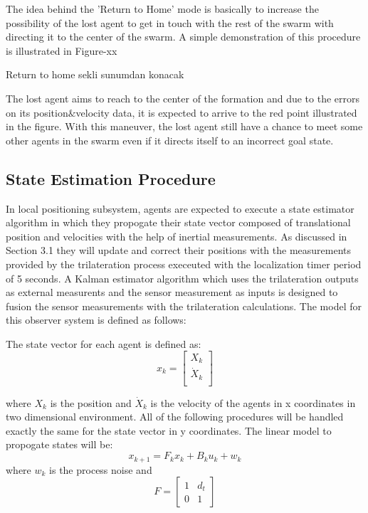 \documentclass[twoside]{article}
\begin{document}
\begin{multicols}{2}
	The idea behind the 'Return to Home' mode is basically to increase the possibility of the lost agent to get in touch with the rest of the swarm with directing it to the center of the swarm. A simple demonstration of this procedure is illustrated in Figure-xx
	
	
	Return to home sekli sunumdan konacak
	
	
	The lost agent aims to reach to the center of the formation and due to the errors on its position$\&$velocity data, it is expected to arrive to the red point illustrated in the figure. With this maneuver, the lost agent still have a chance to meet some other agents in the swarm even if it directs itself to an incorrect goal state. 
	
	
	\subsection{State Estimation Procedure}
	In local positioning subsystem, agents are expected to execute a state estimator algorithm in which they propogate their state vector composed of translational position and velocities with the help of inertial measurements. As discussed in Section 3.1 they will update and correct their positions with the measurements provided by the trilateration process execeuted with the localization timer period of 5 seconds. A Kalman estimator algorithm which uses the trilateration outputs as external measurents and the sensor measurement as inputs is designed to fusion the sensor measurements with the trilateration calculations. The model for this observer system is defined as follows:
	
	The state vector for each agent is defined as:
	\begin{equation}
        x_k = \begin{bmatrix}
            X_k \\
            \dot{X}_k\\
                \end{bmatrix}
	\end{equation}
	
	where $X_k$ is the position and $\dot{X}_k$ is the velocity of the agents in x coordinates in two dimensional environment. All of the following procedures will be handled exactly the same for the state vector in y coordinates.
	The linear model to propogate states will be:
	\begin{equation}
  x_{k+1} = F_kx_{k} + B_ku_k + w_k
	\end{equation}
	where $w_k$ is the process noise and 
	\begin{equation}
   F = \begin{bmatrix}
1 & d_t\\
0 & 1
\end{bmatrix}   
	\end{equation}
	

\end{multicols}
\end{document}
